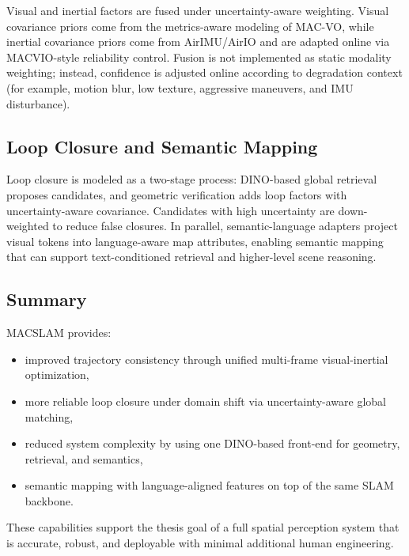 Visual and inertial factors are fused under uncertainty-aware weighting.
Visual covariance priors come from the metrics-aware modeling of MAC-VO, while inertial covariance priors come from AirIMU/AirIO and are adapted online via MACVIO-style reliability control.
Fusion is not implemented as static modality weighting; instead, confidence is adjusted online according to degradation context (for example, motion blur, low texture, aggressive maneuvers, and IMU disturbance).

\subsection{Loop Closure and Semantic Mapping}

Loop closure is modeled as a two-stage process: DINO-based global retrieval proposes candidates, and geometric verification adds loop factors with uncertainty-aware covariance.
Candidates with high uncertainty are down-weighted to reduce false closures.
In parallel, semantic-language adapters project visual tokens into language-aware map attributes, enabling semantic mapping that can support text-conditioned retrieval and higher-level scene reasoning.

\subsection{Summary}

MACSLAM provides:
\begin{itemize}
    \item improved trajectory consistency through unified multi-frame visual-inertial optimization,
    \item more reliable loop closure under domain shift via uncertainty-aware global matching,
    \item reduced system complexity by using one DINO-based front-end for geometry, retrieval, and semantics,
    \item semantic mapping with language-aligned features on top of the same SLAM backbone.
\end{itemize}
These capabilities support the thesis goal of a full spatial perception system that is accurate, robust, and deployable with minimal additional human engineering.